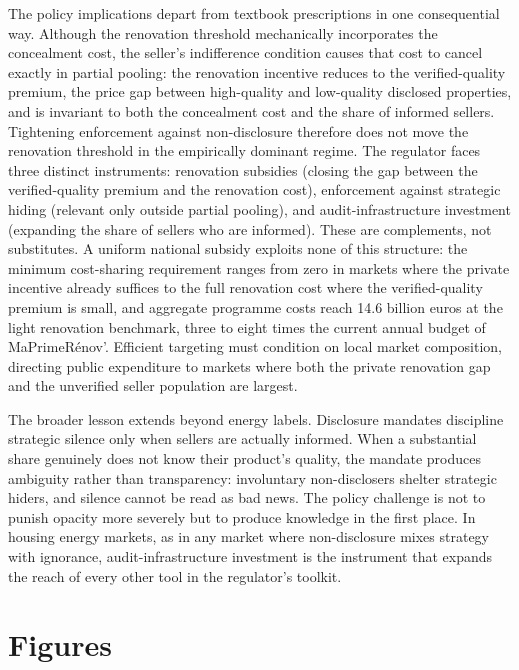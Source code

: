 \documentclass[10pt,letterpaper]{bp-template-concise}
\begin{document}
The policy implications depart from textbook prescriptions in one consequential way. Although the renovation threshold mechanically incorporates the concealment cost, the seller's indifference condition causes that cost to cancel exactly in partial pooling: the renovation incentive reduces to the verified-quality premium, the price gap between high-quality and low-quality disclosed properties, and is invariant to both the concealment cost and the share of informed sellers. Tightening enforcement against non-disclosure therefore does not move the renovation threshold in the empirically dominant regime. The regulator faces three distinct instruments: renovation subsidies (closing the gap between the verified-quality premium and the renovation cost), enforcement against strategic hiding (relevant only outside partial pooling), and audit-infrastructure investment (expanding the share of sellers who are informed). These are complements, not substitutes. A uniform national subsidy exploits none of this structure: the minimum cost-sharing requirement ranges from zero in markets where the private incentive already suffices to the full renovation cost where the verified-quality premium is small, and aggregate programme costs reach 14.6 billion euros at the light renovation benchmark, three to eight times the current annual budget of MaPrimeR\'enov'. Efficient targeting must condition on local market composition, directing public expenditure to markets where both the private renovation gap and the unverified seller population are largest.

The broader lesson extends beyond energy labels. Disclosure mandates discipline strategic silence only when sellers are actually informed. When a substantial share genuinely does not know their product's quality, the mandate produces ambiguity rather than transparency: involuntary non-disclosers shelter strategic hiders, and silence cannot be read as bad news. The policy challenge is not to punish opacity more severely but to produce knowledge in the first place. In housing energy markets, as in any market where non-disclosure mixes strategy with ignorance, audit-infrastructure investment is the instrument that expands the reach of every other tool in the regulator's toolkit.

\clearpage
\appendix



\section{Figures}\label{sec:appendix_figures}
\end{document}
